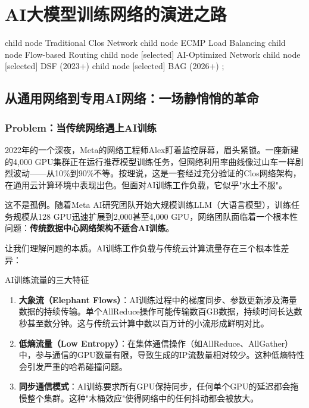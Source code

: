 
\section{AI大模型训练网络的演进之路}
\label{sec:ai-training-network}

\begin{researchtree}
    child { node {Traditional Clos Network}
        child { node {ECMP Load Balancing} }
        child { node {Flow-based Routing} }
    }
    child { node [selected] {AI-Optimized Network}
        child { node [selected] {DSF (2023+)} }
        child { node [selected] {BAG (2026+)} }
    };
\end{researchtree}

\subsection{从通用网络到专用AI网络：一场静悄悄的革命}

\subsubsection{Problem：当传统网络遇上AI训练}

2022年的一个深夜，Meta的网络工程师Alex盯着监控屏幕，眉头紧锁。一座新建的4,000 GPU集群正在运行推荐模型训练任务，但网络利用率曲线像过山车一样剧烈波动——从10\%到90\%不等。按理说，这是一套经过充分验证的Clos网络架构，在通用云计算环境中表现出色。但面对AI训练工作负载，它似乎"水土不服"。

这不是孤例。随着Meta AI研究团队开始大规模训练LLM（大语言模型），训练任务规模从128 GPU迅速扩展到2,000甚至4,000 GPU，网络团队面临着一个根本性问题：\textbf{传统数据中心网络架构不适合AI训练}。

让我们理解问题的本质。AI训练工作负载与传统云计算流量存在三个根本性差异：

\begin{insightbox}{AI训练流量的三大特征}
\begin{enumerate}
    \item \textbf{大象流（Elephant Flows）}：AI训练过程中的梯度同步、参数更新涉及海量数据的持续传输。单个AllReduce操作可能传输数百GB数据，持续时间长达数秒甚至数分钟。这与传统云计算中数以百万计的小流形成鲜明对比。
    
    \item \textbf{低熵流量（Low Entropy）}：在集体通信操作（如AllReduce、AllGather）中，参与通信的GPU数量有限，导致生成的IP流数量相对较少。这种低熵特性会引发严重的哈希碰撞问题。
    
    \item \textbf{同步通信模式}：AI训练要求所有GPU保持同步，任何单个GPU的延迟都会拖慢整个集群。这种"木桶效应"使得网络中的任何抖动都会被放大。
\end{enumerate}
\end{insightbox}

